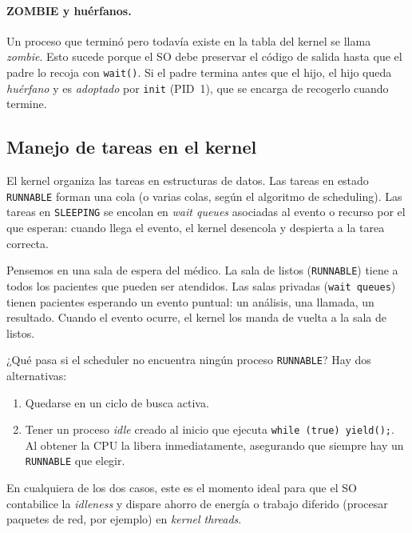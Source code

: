 \documentclass[11pt,a4paper]{article}
\begin{document}
\paragraph{ZOMBIE y huérfanos.} Un proceso que terminó pero todavía
existe en la tabla del kernel se llama \emph{zombie}. Esto sucede
porque el SO debe preservar el código de salida hasta que el padre lo
recoja con \texttt{wait()}. Si el padre termina antes que el hijo, el
hijo queda \emph{huérfano} y es \emph{adoptado} por \texttt{init}
(PID~1), que se encarga de recogerlo cuando termine.

\subsection{Manejo de tareas en el kernel}

El kernel organiza las tareas en estructuras de datos. Las tareas en
estado \texttt{RUNNABLE} forman una cola (o varias colas, según el
algoritmo de scheduling). Las tareas en \texttt{SLEEPING} se encolan
en \emph{wait queues} asociadas al evento o recurso por el que
esperan: cuando llega el evento, el kernel desencola y despierta a la
tarea correcta.

\begin{idea}
Pensemos en una sala de espera del médico. La sala de listos
(\texttt{RUNNABLE}) tiene a todos los pacientes que pueden ser
atendidos. Las salas privadas (\texttt{wait queues}) tienen pacientes
esperando un evento puntual: un análisis, una llamada, un resultado.
Cuando el evento ocurre, el kernel los manda de vuelta a la sala de
listos.
\end{idea}

¿Qué pasa si el scheduler no encuentra ningún proceso \texttt{RUNNABLE}?
Hay dos alternativas:

\begin{enumerate}[leftmargin=*,nosep]
    \item Quedarse en un ciclo de busca activa.
    \item Tener un proceso \emph{idle} creado al inicio que ejecuta
        \texttt{while (true) yield();}. Al obtener la CPU la libera
        inmediatamente, asegurando que siempre hay un \texttt{RUNNABLE}
        que elegir.
\end{enumerate}

En cualquiera de los dos casos, este es el momento ideal para que el
SO contabilice la \emph{idleness} y dispare ahorro de energía o
trabajo diferido (procesar paquetes de red, por ejemplo) en
\emph{kernel threads}.
\end{document}
